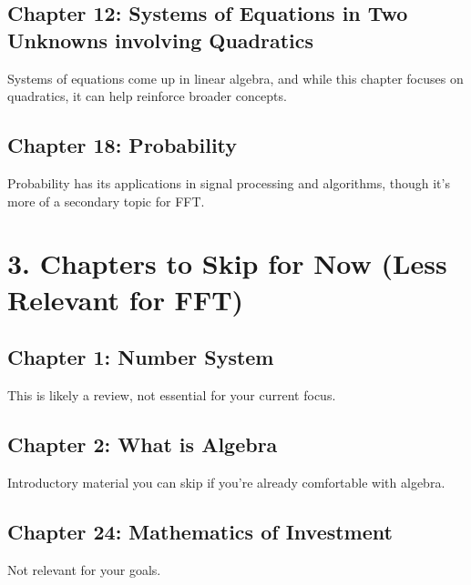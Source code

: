 \documentclass{article}
\begin{document}
\subsection*{Chapter 12: Systems of Equations in Two Unknowns involving Quadratics}
Systems of equations come up in linear algebra, and while this chapter focuses on quadratics, it can help reinforce broader concepts.

\subsection*{Chapter 18: Probability}
Probability has its applications in signal processing and algorithms, though it’s more of a secondary topic for FFT.

\section*{3. Chapters to Skip for Now (Less Relevant for FFT)}

\subsection*{Chapter 1: Number System}
This is likely a review, not essential for your current focus.

\subsection*{Chapter 2: What is Algebra}
Introductory material you can skip if you’re already comfortable with algebra.

\subsection*{Chapter 24: Mathematics of Investment}
Not relevant for your goals.
\end{document}
